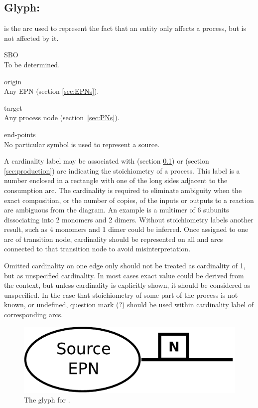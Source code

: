 \subsection{Glyph:  }\label{sec:consumption}

 is the arc used to represent the fact that an entity only affects a process,
but is not affected by it. 

\begin{glyphDescription}
 \item[SBO]\mbox{}\\ To be determined.
 \item[origin]\mbox{}\\ Any EPN (section \ref{sec:EPNs}).
 \item[target]\mbox{}\\ Any process node (section~\ref{sec:PNs}).
 \item[end-points]\mbox{}\\ No particular symbol is used to represent a source.
 \end{glyphDescription}


A cardinality label may be associated with  (section \ref{sec:consumption}) or 
 (section \ref{sec:production}) arc indicating the stoichiometry of a process. This label is a number enclosed in a rectangle with one of the long sides adjacent to the consumption arc. The cardinality is 
required to eliminate ambiguity when the exact composition, or the number of 
copies, of the inputs or outputs to a reaction are ambiguous from the diagram. 
An example is a multimer of 6 subunits dissociating into 2 monomers and 2 
dimers. Without stoichiometry labels another result, such as 4 monomers and 1 
dimer could be inferred. 
Once assigned to one arc of transition node, cardinality should be represented on
all  and  arcs connected to that transition
node to avoid misinterpretation.

Omitted cardinality on one edge only should not be treated as cardinality of 1, but
as unspecified cardinality. In most cases exact value could be derived from the
context, but unless cardinality is explicitly shown, it should be considered as
unspecified. In the case that stoichiometry of some part of the process is not
known, or undefined, question mark (?) should be used within cardinality label
of corresponding arcs.

\begin{figure}[H]
  \centering
  \includegraphics[scale = 0.5]{images/consumption}
  \caption{The \PD glyph for .}
  \label{fig:consumption}
\end{figure}

